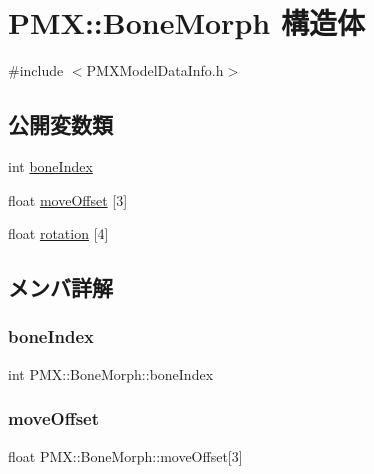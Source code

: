 \hypertarget{struct_p_m_x_1_1_bone_morph}{}\section{P\+MX\+:\+:Bone\+Morph 構造体}
\label{struct_p_m_x_1_1_bone_morph}


{\ttfamily \#include $<$P\+M\+X\+Model\+Data\+Info.\+h$>$}

\subsection*{公開変数類}
\begin{DoxyCompactItemize}
\item 
int \mbox{\hyperlink{struct_p_m_x_1_1_bone_morph_acab28633c2c5cb382330d8d1f35b07fb}{bone\+Index}}
\item 
float \mbox{\hyperlink{struct_p_m_x_1_1_bone_morph_a576e643e952f92daf071ef8a5cde6b22}{move\+Offset}} \mbox{[}3\mbox{]}
\item 
float \mbox{\hyperlink{struct_p_m_x_1_1_bone_morph_a765b017153f5f2723061b9193b872515}{rotation}} \mbox{[}4\mbox{]}
\end{DoxyCompactItemize}


\subsection{メンバ詳解}
\mbox{\label{struct_p_m_x_1_1_bone_morph_acab28633c2c5cb382330d8d1f35b07fb}} 
\subsubsection{\texorpdfstring{bone\+Index}{boneIndex}}
{\footnotesize\ttfamily int P\+M\+X\+::\+Bone\+Morph\+::bone\+Index}

\mbox{\label{struct_p_m_x_1_1_bone_morph_a576e643e952f92daf071ef8a5cde6b22}} 
\subsubsection{\texorpdfstring{move\+Offset}{moveOffset}}
{\footnotesize\ttfamily float P\+M\+X\+::\+Bone\+Morph\+::move\+Offset\mbox{[}3\mbox{]}}


